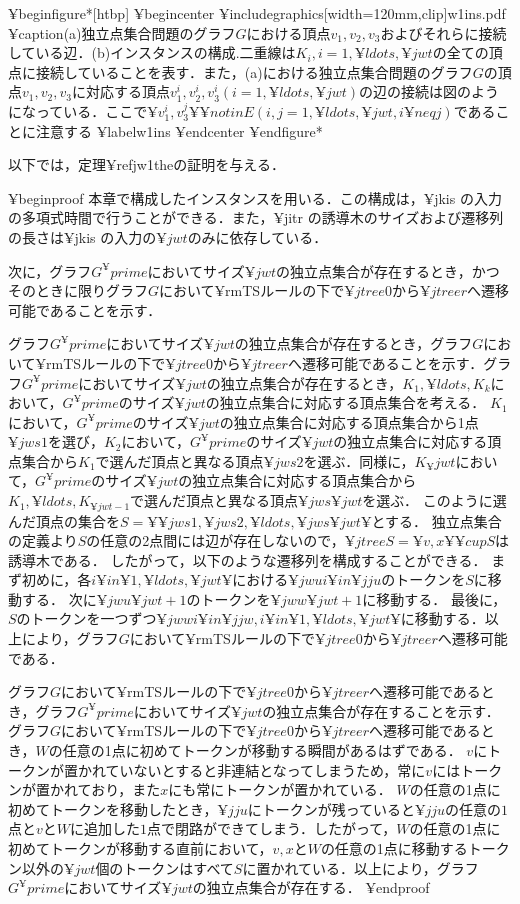 ¥begin{figure*}[htbp]
	¥begin{center}
		¥includegraphics[width=120mm,clip]{w1ins.pdf}
		¥caption{(a)独立点集合問題のグラフ$G$における頂点$v_1,v_2,v_3$およびそれらに接続している辺．(b)インスタンスの構成.二重線は$K_i,i=1,¥ldots,¥jwt$の全ての頂点に接続していることを表す．また，(a)における独立点集合問題のグラフ$G$の頂点$v_1,v_2,v_3$に対応する頂点$v_1^i,v_2^i,v_3^i(i=1,¥ldots,¥jwt)$の辺の接続は図のようになっている．ここで$¥{v_1^i,v_3^j¥}¥notin E(i,j=1,¥ldots,¥jwt,i¥neq j)$であることに注意する}
		¥label{w1ins}
	¥end{center}
¥end{figure*}



以下では，定理¥ref{jw1the}の証明を与える．

¥begin{proof}
	本章で構成したインスタンスを用いる．この構成は，¥jkis の入力の多項式時間で行うことができる．また，¥jitr の誘導木のサイズおよび遷移列の長さは¥jkis の入力の$¥jwt$のみに依存している．
	
	次に，グラフ$G^¥prime$においてサイズ$¥jwt$の独立点集合が存在するとき，かつそのときに限りグラフ$G$において¥rm{TS}ルールの下で$¥jtree{0}$から$¥jtree{r}$へ遷移可能であることを示す．
	
	グラフ$G^¥prime$においてサイズ$¥jwt$の独立点集合が存在するとき，グラフ$G$において¥rm{TS}ルールの下で$¥jtree{0}$から$¥jtree{r}$へ遷移可能であることを示す．グラフ$G^¥prime$においてサイズ$¥jwt$の独立点集合が存在するとき，$K_1,¥ldots,K_k$において，$G^¥prime$のサイズ$¥jwt$の独立点集合に対応する頂点集合を考える．
	$K_1$において，$G^¥prime$のサイズ$¥jwt$の独立点集合に対応する頂点集合から1点$¥jws{1}$を選び，$K_2$において，$G^¥prime$のサイズ$¥jwt$の独立点集合に対応する頂点集合から$K_1$で選んだ頂点と異なる頂点$¥jws{2}$を選ぶ．同様に，$K_¥jwt$において，$G^¥prime$のサイズ$¥jwt$の独立点集合に対応する頂点集合から$K_1,¥ldots,K_{¥jwt-1}$で選んだ頂点と異なる頂点$¥jws{¥jwt}$を選ぶ．
	このように選んだ頂点の集合を$S=¥{¥jws{1},¥jws{2},¥ldots,¥jws{¥jwt}¥}$とする．
	独立点集合の定義より$S$の任意の2点間には辺が存在しないので，$¥jtree{S}=¥{v,x¥}¥cup S$は誘導木である．
	したがって，以下のような遷移列を構成することができる．
	まず初めに，各$i¥in ¥{1,¥ldots,¥jwt¥}$における$¥jwu{i}¥in ¥jju$のトークンを$S$に移動する．
	次に$¥jwu{¥jwt+1}$のトークンを$¥jww{¥jwt+1}$に移動する．
	最後に，$S$のトークンを一つずつ$¥jww{i}¥in ¥jjw,i¥in ¥{1,¥ldots,¥jwt¥}$に移動する．以上により，グラフ$G$において¥rm{TS}ルールの下で$¥jtree{0}$から$¥jtree{r}$へ遷移可能である．
	
	グラフ$G$において¥rm{TS}ルールの下で$¥jtree{0}$から$¥jtree{r}$へ遷移可能であるとき，グラフ$G^¥prime$においてサイズ$¥jwt$の独立点集合が存在することを示す．グラフ$G$において¥rm{TS}ルールの下で$¥jtree{0}$から$¥jtree{r}$へ遷移可能であるとき，$W$の任意の1点に初めてトークンが移動する瞬間があるはずである．
	$v$にトークンが置かれていないとすると非連結となってしまうため，常に$v$にはトークンが置かれており，また$x$にも常にトークンが置かれている．
	$W$の任意の1点に初めてトークンを移動したとき，$¥jju$にトークンが残っていると$¥jju$の任意の$1$点と$v$と$W$に追加した$1$点で閉路ができてしまう．したがって，$W$の任意の1点に初めてトークンが移動する直前において，$v,x$と$W$の任意の1点に移動するトークン以外の$¥jwt$個のトークンはすべて$S$に置かれている．以上により，グラフ$G^¥prime$においてサイズ$¥jwt$の独立点集合が存在する．
¥end{proof}

